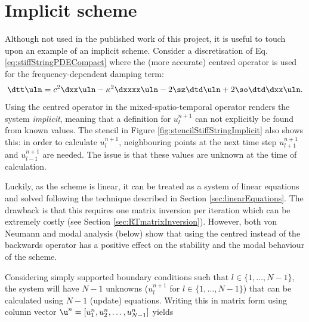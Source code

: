 {\section{Implicit scheme}\label{sec:implicitStiffString}
Although not used in the published work of this project, it is useful to touch upon an example of an implicit scheme. Consider a discretisation of Eq. \eqref{eq:stiffStringPDECompact} where the (more accurate) centred operator is used for the frequency-dependent damping term:
\begin{equation}\label{eq:stiffStringFDSImplicit}
    \dtt \uln = c^2 \dxx \uln - \kappa^2 \dxxxx \uln - 2 \sz \dtd \uln + 2 \so\dtd\dxx \uln.
\end{equation}
Using the centred operator in the mixed-spatio-temporal operator renders the system \textit{implicit}, meaning that a definition for $u_l^{n+1}$ can not explicitly be found from known values. The stencil in Figure \ref{fig:stencilStiffStringImplicit} also shows this: in order to calculate $u_l^{n+1}$, neighbouring points at the next time step $u_{l+1}^{n+1}$ and $u_{l-1}^{n+1}$ are needed. The issue is that these values are unknown at the time of calculation.

Luckily, as the scheme is linear, it can be treated as a system of linear equations and solved following the technique described in Section \ref{sec:linearEquations}. The drawback is that this requires one matrix inversion per iteration which can be extremely costly (see Section \ref{sec:RTmatrixInversion}). However, both von Neumann and modal analysis (below) show that using the centred instead of the backwards operator has a positive effect on the stability and the modal behaviour of the scheme. 

Considering simply supported boundary conditions such that $l \in \{1, \hdots, N-1\}$, the system will have $N-1$ unknowns ($u_l^{n+1}$ for $l \in \{1, \hdots, N-1\}$) that can be calculated using $N-1$ (update) equations. Writing this in matrix form using column vector $\u^n = [u_1^n, u_2^n, \hdots, u_{N-1}^n]$ yields 

}
